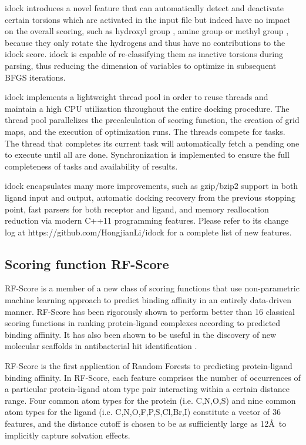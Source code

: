 \documentclass[10pt]{article}
\begin{document}
idock introduces a novel feature that can automatically detect and deactivate certain torsions which are activated in the input file but indeed have no impact on the overall scoring, such as hydroxyl group , amine group  or methyl group , because they only rotate the hydrogens and thus have no contributions to the idock score. idock is capable of re-classifying them as inactive torsions during parsing, thus reducing the dimension of variables to optimize in subsequent BFGS iterations.

idock implements a lightweight thread pool in order to reuse threads and maintain a high CPU utilization throughout the entire docking procedure. The thread pool parallelizes the precalculation of scoring function, the creation of grid maps, and the execution of optimization runs. The threads compete for tasks. The thread that completes its current task will automatically fetch a pending one to execute until all are done. Synchronization is implemented to ensure the full completeness of tasks and availability of results.

idock encapsulates many more improvements, such as gzip/bzip2 support in both ligand input and output, automatic docking recovery from the previous stopping point, fast parsers for both receptor and ligand, and memory reallocation reduction via modern C++11 programming features. Please refer to its change log at https://github.com/HongjianLi/idock for a complete list of new features.

\subsection*{Scoring function RF-Score}
RF-Score \cite{564} is a member of a new class of scoring functions that use non-parametric machine learning approach to predict binding affinity in an entirely data-driven manner. RF-Score has been rigorously shown \cite{564,908} to perform better than 16 classical scoring functions in ranking protein-ligand complexes according to predicted binding affinity. It has also been shown to be useful in the discovery of new molecular scaffolds in antibacterial hit identification \cite{1281}.

RF-Score is the first application of Random Forests \cite{1309} to predicting protein-ligand binding affinity. In RF-Score, each feature comprises the number of occurrences of a particular protein-ligand atom type pair interacting within a certain distance range. Four common atom types for the protein (i.e. C,N,O,S) and nine common atom types for the ligand (i.e. C,N,O,F,P,S,Cl,Br,I) constitute a vector of 36 features, and the distance cutoff is chosen to be as sufficiently large as 12\AA\ to implicitly capture solvation effects.
\end{document}
